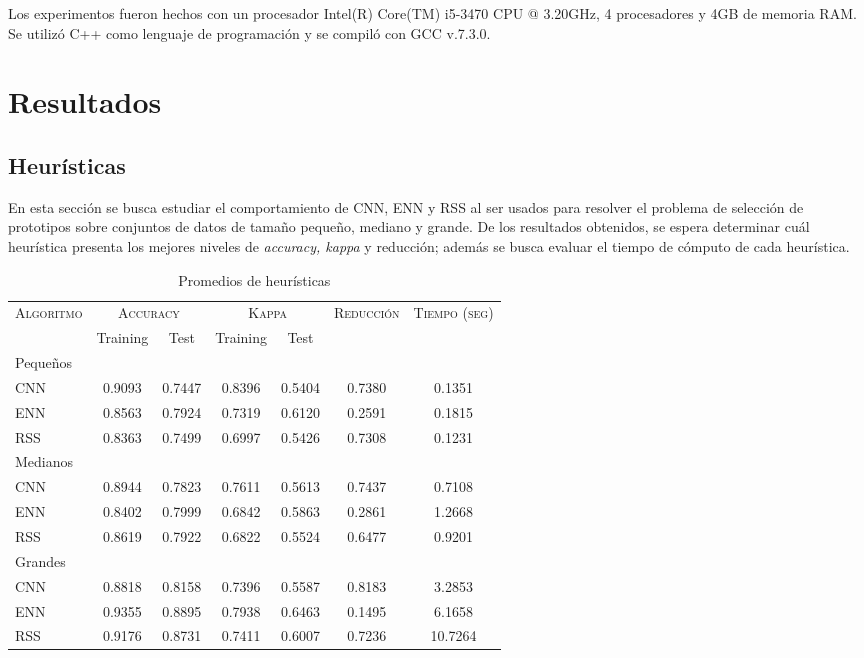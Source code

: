 Los experimentos fueron hechos con un procesador Intel(R) Core(TM) i5-3470 CPU @ 3.20GHz, 4 procesadores y 4GB de memoria RAM. Se utilizó C++ como lenguaje de programación y se compiló con GCC v.7.3.0.

\section{Resultados}

\subsection{Heurísticas}

En esta sección se busca estudiar el comportamiento de CNN, ENN y RSS al ser usados para resolver el problema de selección de prototipos sobre conjuntos de datos de tamaño pequeño, mediano y grande. De los resultados obtenidos, se espera determinar cuál heurística presenta los mejores niveles de \emph{accuracy, kappa} y reducción; además se busca evaluar el tiempo de cómputo de cada heurística.


\begin{table}[h!]
\centering
\begin{tabular}{l c c c c c c}
\hline
\multirow{2}{*}{\textsc{Algoritmo}}
	& \multicolumn{2}{c}{\textsc{Accuracy}}
	& \multicolumn{2}{c}{\textsc{Kappa}}
	& \textsc{Reducción}
	& \textsc{Tiempo (seg)} \\
	& Training & Test
	& Training & Test \\ 
\hline
\hline

Pequeños\\
CNN & 0.9093 & 0.7447 & 0.8396 & 0.5404 & 0.7380 & 0.1351 \\
ENN & 0.8563 & 0.7924 & 0.7319 & 0.6120 & 0.2591 & 0.1815 \\
RSS & 0.8363 & 0.7499 & 0.6997 & 0.5426 & 0.7308 & 0.1231 \\

\hline

Medianos\\
CNN & 0.8944 & 0.7823 & 0.7611 & 0.5613 & 0.7437 & 0.7108 \\
ENN & 0.8402 & 0.7999 & 0.6842 & 0.5863 & 0.2861 & 1.2668 \\
RSS & 0.8619 & 0.7922 & 0.6822 & 0.5524 & 0.6477 & 0.9201 \\

\hline

Grandes\\
CNN & 0.8818 & 0.8158 & 0.7396 & 0.5587 & 0.8183 & 3.2853 \\
ENN & 0.9355 & 0.8895 & 0.7938 & 0.6463 & 0.1495 & 6.1658 \\
RSS & 0.9176 & 0.8731 & 0.7411 & 0.6007 & 0.7236 & 10.7264 \\


\hline
\end{tabular}
\caption{Promedios de heurísticas}
\label{heu}
\end{table}

